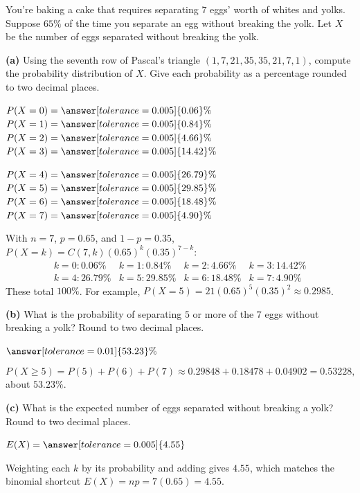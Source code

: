 \documentclass[12pt]{ximera}
\begin{document}
\begin{problem}
You're baking a cake that requires separating $7$ eggs' worth of whites and yolks.
Suppose $65\%$ of the time you separate an egg without breaking the yolk. Let $X$ be the
number of eggs separated without breaking the yolk.

\begin{prompt}
\textbf{(a)} Using the seventh row of Pascal's triangle $(1,7,21,35,35,21,7,1)$,
compute the probability distribution of $X$. Give each probability as a percentage
rounded to two decimal places.

$P(X=0)=\answer[tolerance=0.005]{0.06}\%$ \quad
$P(X=1)=\answer[tolerance=0.005]{0.84}\%$ \quad
$P(X=2)=\answer[tolerance=0.005]{4.66}\%$ \quad
$P(X=3)=\answer[tolerance=0.005]{14.42}\%$

\smallskip
$P(X=4)=\answer[tolerance=0.005]{26.79}\%$ \quad
$P(X=5)=\answer[tolerance=0.005]{29.85}\%$ \quad
$P(X=6)=\answer[tolerance=0.005]{18.48}\%$ \quad
$P(X=7)=\answer[tolerance=0.005]{4.90}\%$

\begin{feedback}
With $n=7$, $p=0.65$, and $1-p=0.35$, $P(X=k)=C(7,k)(0.65)^k(0.35)^{7-k}$:
\[
\begin{array}{llll}
k=0: 0.06\% & k=1: 0.84\% & k=2: 4.66\% & k=3: 14.42\%\\
k=4: 26.79\% & k=5: 29.85\% & k=6: 18.48\% & k=7: 4.90\%
\end{array}
\]
These total $100\%$. For example, $P(X=5)=21(0.65)^5(0.35)^2\approx 0.2985$.
\end{feedback}
\end{prompt}

\begin{prompt}
\textbf{(b)} What is the probability of separating $5$ or more of the $7$ eggs without
breaking a yolk? Round to two decimal places.

$\answer[tolerance=0.01]{53.23}\%$

\begin{feedback}
\[ P(X\ge 5)=P(5)+P(6)+P(7)\approx 0.29848+0.18478+0.04902=0.53228, \]
about $53.23\%$.
\end{feedback}
\end{prompt}

\begin{prompt}
\textbf{(c)} What is the expected number of eggs separated without breaking a yolk?
Round to two decimal places.

$E(X)=\answer[tolerance=0.005]{4.55}$

\begin{feedback}
Weighting each $k$ by its probability and adding gives $4.55$, which matches the
binomial shortcut $E(X)=np=7(0.65)=4.55$.
\end{feedback}
\end{prompt}
\end{problem}
\end{document}
